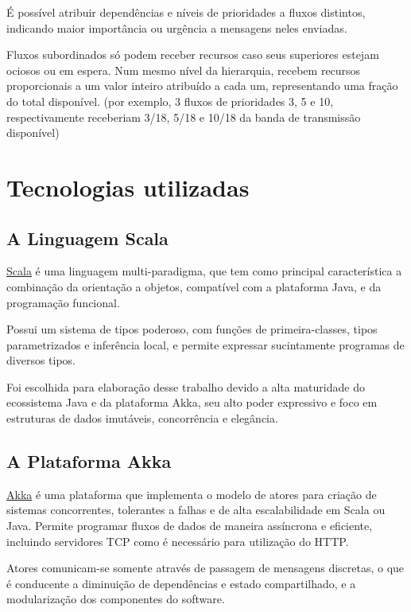 \documentclass[12pt,a4paper,openright,twoside,english,brazil,]{abntex2}	%
\begin{document}
É possível atribuir dependências e níveis de prioridades a fluxos
distintos, indicando maior importância ou urgência a mensagens neles
enviadas.

Fluxos subordinados só podem receber recursos caso seus superiores
estejam ociosos ou em espera. Num mesmo nível da hierarquia, recebem
recursos proporcionais a um valor inteiro atribuído a cada um,
representando uma fração do total disponível. (por exemplo, 3 fluxos de
prioridades 3, 5 e 10, respectivamente receberiam 3/18, 5/18 e 10/18 da
banda de transmissão disponível)

\section{Tecnologias utilizadas}\label{tecnologias-utilizadas}

\subsection{A Linguagem Scala}\label{a-linguagem-scala}

\href{}{Scala} é uma linguagem multi-paradigma, que tem como principal
característica a combinação da orientação a objetos, compatível com a
plataforma Java, e da programação funcional.

Possui um sistema de tipos poderoso, com funções de primeira-classes,
tipos parametrizados e inferência local, e permite expressar
sucintamente programas de diversos tipos.

Foi escolhida para elaboração desse trabalho devido a alta maturidade do
ecossistema Java e da plataforma Akka, seu alto poder expressivo e foco
em estruturas de dados imutáveis, concorrência e elegância.

\subsection{A Plataforma Akka}\label{a-plataforma-akka}

\href{}{Akka} é uma plataforma que implementa o modelo de atores para
criação de sistemas concorrentes, tolerantes a falhas e de alta
escalabilidade em Scala ou Java. Permite programar fluxos de dados de
maneira assíncrona e eficiente, incluindo servidores TCP como é
necessário para utilização do HTTP.

Atores comunicam-se somente através de passagem de mensagens discretas,
o que é conducente a diminuição de dependências e estado compartilhado,
e a modularização dos componentes do software.
\end{document}
